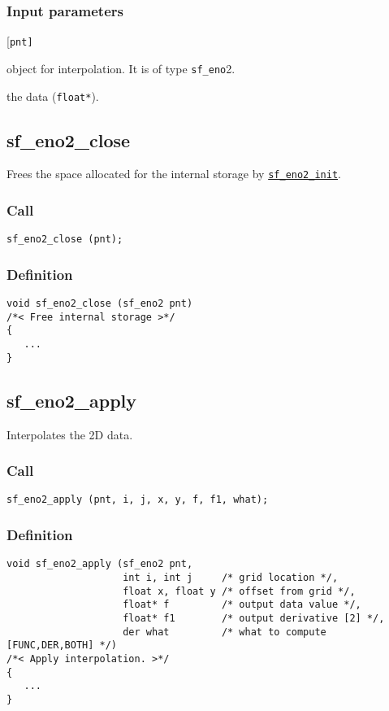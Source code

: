 \subsubsection*{Input parameters}
\begin{desclist}{\tt }{\quad}[\tt pnt]
   \setlength\itemsep{0pt}
   \item[pnt] object for interpolation. It is of type \texttt{sf\_eno}2.
   \item[c]   the data (\texttt{float*}).  
\end{desclist}




\subsection{{sf\_eno2\_close}}
Frees the space allocated for the internal storage by \hyperref[sec:sf_eno2_init]{\texttt{sf\_eno2\_init}}.

\subsubsection*{Call}
\begin{verbatim}sf_eno2_close (pnt);\end{verbatim}

\subsubsection*{Definition}
\begin{verbatim}
void sf_eno2_close (sf_eno2 pnt)
/*< Free internal storage >*/
{
   ...
}
\end{verbatim}




\subsection{{sf\_eno2\_apply}}
Interpolates the 2D data.

\subsubsection*{Call}
\begin{verbatim}sf_eno2_apply (pnt, i, j, x, y, f, f1, what);\end{verbatim}

\subsubsection*{Definition}
\begin{verbatim}
void sf_eno2_apply (sf_eno2 pnt, 
                    int i, int j     /* grid location */, 
                    float x, float y /* offset from grid */, 
                    float* f         /* output data value */, 
                    float* f1        /* output derivative [2] */,
                    der what         /* what to compute [FUNC,DER,BOTH] */)
/*< Apply interpolation. >*/
{
   ...
}
\end{verbatim}

